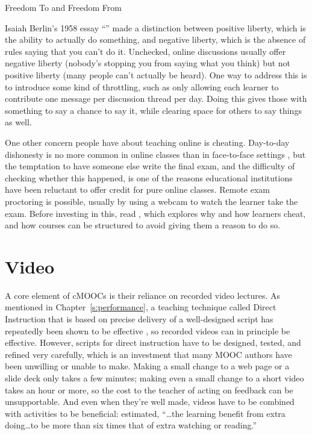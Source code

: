 \begin{aside}{Freedom To and Freedom From}

Isaiah Berlin's 1958 essay ``'' made a distinction between positive
liberty, which is the ability to actually do something, and negative
liberty, which is the absence of rules saying that you can't do
it. Unchecked, online discussions usually offer negative liberty
(nobody's stopping you from saying what you think) but not positive
liberty (many people can't actually be heard). One way to address
this is to introduce some kind of throttling, such as only allowing
each learner to contribute one message per discussion thread per
day. Doing this gives those with something to say a chance to say
it, while clearing space for others to say things as well.

\end{aside}

One other concern people have about teaching online is cheating.
Day-to-day dishonesty is no more common in online classes than in
face-to-face settings \cite{Beck2014}, but the temptation to have
someone else write the final exam, and the difficulty of checking
whether this happened, is one of the reasons educational institutions
have been reluctant to offer credit for pure online classes. Remote exam
proctoring is possible, usually by using a webcam to watch the learner
take the exam. Before investing in this, read \cite{Lang2013}, which
explores why and how learners cheat, and how courses can be structured
to avoid giving them a reason to do so.

\section{Video}\label{s:online-video}

A core element of cMOOCs is their reliance on recorded video lectures.
As mentioned in Chapter~\ref{s:performance}, a teaching technique called
Direct Instruction that is based on precise delivery of a well-designed
script has repeatedly been shown to be effective \cite{Stoc2018}, so
recorded videos can in principle be effective. However, scripts for
direct instruction have to be designed, tested, and refined very
carefully, which is an investment that many MOOC authors have been
unwilling or unable to make. Making a small change to a web page or a
slide deck only takes a few minutes; making even a small change to a
short video takes an hour or more, so the cost to the teacher of acting
on feedback can be unsupportable. And even when they're well made,
videos have to be combined with activities to be beneficial:
\cite{Koed2015} estimated, ``{\ldots}the learning benefit from
extra doing{\ldots}to be more than six times that of extra
watching or reading.''

